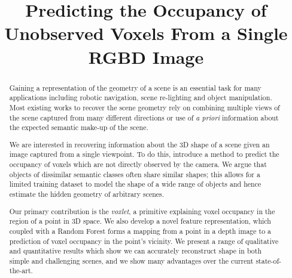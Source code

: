 \documentclass[10pt,twocolumn,letterpaper]{article}
\title{Predicting the Occupancy of Unobserved Voxels From a Single RGBD Image}
\begin{document}
\maketitle

\begin{abstract}
	Gaining a representation of the geometry of a scene is an essential task for many applications including robotic navigation, scene re-lighting and object manipulation. 
	Most existing works to recover the scene geometry rely on combining multiple views of the scene captured from many different directions or use of \emph{a priori} information about the expected semantic make-up of the scene.

  We are interested in recovering information about the 3D shape of a scene given an image captured from a single viewpoint.
  To do this, introduce a method to predict the occupancy of voxels which are not directly observed by the camera.
	We argue that objects of dissimilar semantic classes often share similar shapes; this allows for a limited training dataset to model the shape of a wide range of objects and hence estimate the hidden geometry of arbitrary scenes.

	Our primary contribution is the \emph{voxlet}, a primitive explaining voxel occupancy in the region of a point in 3D space. We also develop a novel feature representation, which coupled with a Random Forest forms a mapping from a point in a depth image to a prediction of voxel occupancy in the point's vicinity.
  We present a range of qualitative and quantitative results which show we can accurately reconstruct shape in both simple and challenging scenes, and we show many advantages over the current state-of-the-art.


\end{abstract}
\end{document}
